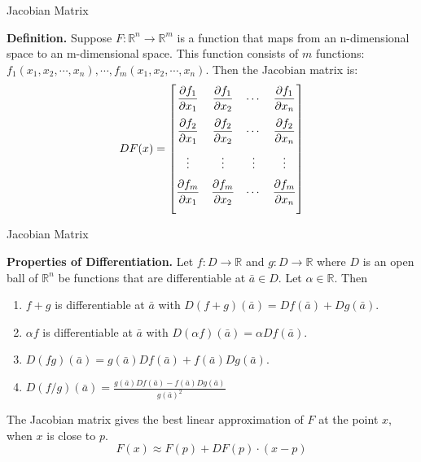 \documentclass[aspectratio=169, UTF8]{ctexbeamer}
\begin{document}
    \begin{frame}[t]{Jacobian Matrix}
        \begin{block}
            \par \textbf{Definition.} Suppose $F:\mathbb{R}^n\rightarrow\mathbb{R}^m$ is a function that maps from an n-dimensional space to an m-dimensional space. This function consists of $m$ functions: $f_1(x_1,x_2,\cdots, x_n),\cdots,f_m(x_1,x_2,\cdots, x_n)$. Then the Jacobian matrix is:
        \begin{equation*}
DF(x) = 
	\begin{bmatrix}
		\vspace{1.5ex}
		\dfrac{\partial f_1}{\partial x_1} & \dfrac{\partial f_1}{\partial x_2}  & \cdots & \dfrac{\partial f_1}{\partial x_n}\\ 
		\vspace{1.5ex}
		\dfrac{\partial f_2}{\partial x_1} & \dfrac{\partial f_2}{\partial x_2}  & \cdots & \dfrac{\partial f_2}{\partial x_n}\\
		\vspace{1.5ex}
		\vdots                             & \vdots                              & \vdots & \vdots                            \\
		\vspace{1.5ex}
		\dfrac{\partial f_m}{\partial x_1} & \dfrac{\partial f_m}{\partial x_2}  & \cdots & \dfrac{\partial f_m}{\partial x_n}
	\end{bmatrix}
\end{equation*}

        \end{block}

    \end{frame}

    \begin{frame}{Jacobian Matrix}
        \begin{block}
            \par \textbf{Properties of Differentiation.} Let $f: D \to \mathbb{R}$ and $g: D \to \mathbb{R}$ where $D$ is an open ball of $\mathbb{R}^n$ be functions that are differentiable at $\bar{a} \in D$. Let $\alpha \in \mathbb{R}$. Then 
            \begin{enumerate}
                \item $f + g$ is differentiable at $\bar{a}$ with $D(f+g) (\bar{a}) = Df(\bar{a}) + Dg (\bar{a})$.
                \item $\alpha f$ is differentiable at $\bar{a}$ with $D(\alpha f) (\bar{a}) = \alpha D f(\bar{a})$.
                \item $D(fg) (\bar{a}) = g (\bar{a})Df(\bar{a}) + f(\bar{a})Dg (\bar{a})$.
                \item $D(f/g) (\bar{a}) = \frac{g (\bar{a})Df(\bar{a}) - f(\bar{a})Dg (\bar{a})}{g (\bar{a})^2}$
            \end{enumerate}
        \end{block}

        \par The Jacobian matrix gives the best linear approximation of $F$ at the point $x$, when $x$ is close to $p$.
        $$F(x) \approx F(p) + DF(p)\cdot (x-p)$$
    \end{frame}
    
\end{document}
